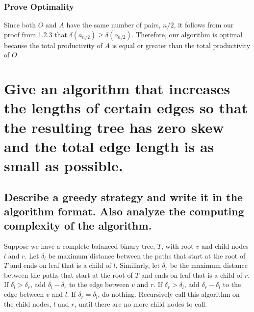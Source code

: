 \documentclass[11pt]{scrartcl}
\begin{document}
\subsubsection{
	Prove Optimality
}
Since both $O$ and $A$ have the same number of pairs, $n/2$, it follows from our proof
from 1.2.3 that $\delta(a_{n/2}) \geq \delta(o_{n/2})$. Therefore, our algorithm is
optimal because
the total productivity of $A$ is equal or greater than the total productivity of
$O$.

\section{
  Give an algorithm that increases the lengths of certain edges so that
  the resulting tree has zero skew and the total edge length is as small as
  possible.
 }

\subsection{
	Describe a greedy strategy and write it in the algorithm format. Also
	analyze the computing complexity of the algorithm.
}
Suppose we have a complete balanced binary tree, $T$, with root $v$ 
and child nodes $l$ and $r$. Let $\delta_l$ be maximum distance between
the paths that start at the root of $T$ and ends on leaf that is a child of $l$. 
Similiarly, let $\delta_r$ be the maximum distance between
the paths that start at the root of $T$ and ends on leaf that is a child of $r$. 
If $\delta_l > \delta_r$, add $\delta_l - \delta_r$ to the edge between
$v$ and $r$. 
If $\delta_r > \delta_l$, add $\delta_r - \delta_l$ to the edge between
$v$ and $l$.
If $\delta_r = \delta_l$, do nothing. Recursively call this algorithm
on the child nodes, $l$ and $r$, until there are no more child nodes to call. 
\iffalse
\begin{algorithm}
	\KwData{$T = (V,E,\ell)$, a complete balanced binary tree with an associated edge length}
	\KwResult{A tree has zero skew and the total edge length is as small as	possible}
	\Fn{timingCircuit($T$)}{
		\For{$v \in V$ in level order traversal}{
			\#$l$, $r$ is left, right child of $v$ respectively\\
			\If{$l$ and $r$ exists}{
				$\delta_l \leftarrow$  
				max(paths that start at the root of $T$ and ends on leaf that is a child of $l$) \\
				$\delta_r \leftarrow$  
				max(paths that start at the root of $T$ and ends on leaf that is a child of $r$) \\
				\# Where $\ell_{(a,b)}$ is the associated length of edge $(a,b) \in E$\\  
				\If{$\delta_l > \delta_r$}{
					Increment $\ell_{(v,r)}$ by $\delta_l - \delta_r$  
				}
				\ElseIf{$\delta_r > \delta_l$}{
					Increment $\ell_{(v,l)}$ by $\delta_r - \delta_l$
				}
			}
		}
		\Return{$T$}
	}
\end{algorithm}
\fi
\end{document}

